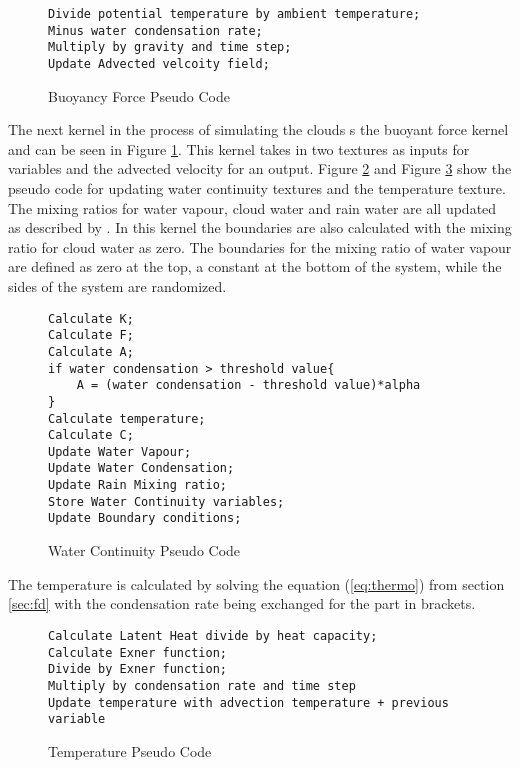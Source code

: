 \begin{figure}[h]
\centering
\begin{lstlisting}
Divide potential temperature by ambient temperature;
Minus water condensation rate;
Multiply by gravity and time step;
Update Advected velcoity field;
\end{lstlisting}
\caption{Buoyancy Force Pseudo Code}
\label{sc:buoyant force}
\end{figure}

The next kernel in the process of simulating the clouds s the buoyant force kernel and can be seen in Figure \ref{sc:buoyant force}.
This kernel takes in two textures as inputs for variables and the advected velocity for an output.
Figure \ref{sc:water} and Figure \ref{sc:thermo} show the pseudo code for updating water continuity textures and the temperature texture. 
The mixing ratios for water vapour, cloud water and rain water are all updated as described by \cite{houze1994cloud}.
In this kernel the boundaries are also calculated with the mixing ratio for cloud water as zero.
The boundaries for the mixing ratio of water vapour are defined as zero at the top, a constant at the bottom of the system, while the sides of the system are randomized.

\begin{figure}[h]
\centering
\begin{lstlisting}
Calculate K;
Calculate F;
Calculate A;
if water condensation > threshold value{
	A = (water condensation - threshold value)*alpha
}
Calculate temperature;
Calculate C;
Update Water Vapour;
Update Water Condensation;
Update Rain Mixing ratio;
Store Water Continuity variables;
Update Boundary conditions;
\end{lstlisting}
\caption{Water Continuity Pseudo Code}
\label{sc:water}
\end{figure}

The temperature is calculated by solving the equation (\ref{eq:thermo}) from section \ref{sec:fd} with the condensation rate being exchanged for the part in brackets.

\begin{figure}[h]
\centering
\begin{lstlisting}
Calculate Latent Heat divide by heat capacity;
Calculate Exner function;
Divide by Exner function;
Multiply by condensation rate and time step
Update temperature with advection temperature + previous variable
\end{lstlisting}
\caption{Temperature Pseudo Code}
\label{sc:thermo}
\end{figure}


